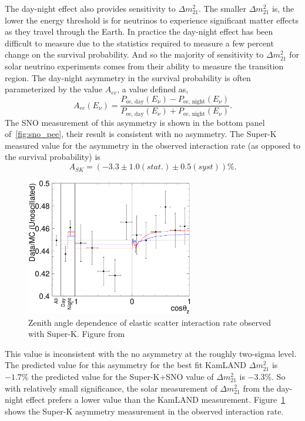 The day-night effect also provides sensitivity to $\Delta m^{2}_{21}$.
The smaller $\Delta m^{2}_{21}$ is, the lower the energy threshold is for
neutrinos to experience significant matter effects as they travel through the
Earth.
In practice the day-night effect has been difficult to measure due to
the statistics required to measure a few percent change on the survival
probability.
And so the majority of sensitivity to $\Delta m^{2}_{21}$ for solar neutrino
experiments comes from their ability to measure the transition region.
The day-night asymmetry in the survival probability is often parameterized by the value $A_{ee}$, a value
defined as,
\begin{equation}
    A_{ee}(E_\nu) = \frac{P_{\text{ee, day}}(E_\nu) - P_{\text{ee, night}}(E_\nu)}{P_{\text{ee, day}}(E_\nu) + P_{\text{ee, night}}(E_\nu)}\text{.}
\end{equation}
The SNO measurement of this asymmetry is shown in the bottom panel of~\ref{fig:sno_pee},
their result is consistent with no asymmetry.
The Super-K measured value for the asymmetry in the observed interaction rate (as opposed to
the survival probability) is
\begin{equation*}
    A_{SK} = (-3.3 \pm 1.0(stat.)\pm 0.5(syst))\%\text{.} 
\end{equation*}

\begin{figure}[htbp]
    \centering
    \includegraphics[width=0.65\textwidth]{sk_daynight}
    \caption[Super-K Day Night Asymmetry Measurement]{Zenith angle dependence
    of elastic scatter interaction rate observed with Super-K. Figure
    from~\citep{superk4}}
    \label{fig:sk_daynight}
\end{figure}

This value is inconsistent with the no asymmetry at the roughly two-sigma level.
The predicted value for this asymmetry for the best fit KamLAND $\Delta m^{2}_{21}$
is $-1.7\%$ the predicted value for the Super-K+SNO value of $\Delta m^{2}_{21}$ is
$-3.3\%$.%
So with relatively small significance, the solar measurement of $\Delta m^{2}_{21}$ from the day-night effect
prefers a lower value than the KamLAND measurement.
Figure~\ref{fig:sk_daynight} shows the Super-K asymmetry measurement in the
observed interaction rate.

